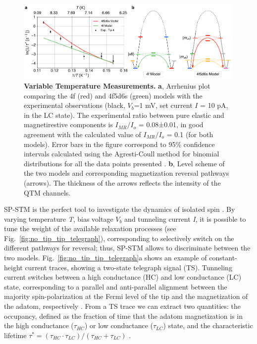 \documentclass[
reprint,amsmath,amssymb,aps]{revtex4-2}
\begin{document}
\begin{figure}[t!]
\includegraphics[width=0.99\textwidth]{Fig3_new.pdf}
\caption{\textbf{Variable Temperature Measurements.} \textbf{a}, Arrhenius plot comparing the 4f (red) and 4f5d6s (green) models with the experimental observations (black, $V_b$=1 mV, set current $I$ = 10 pA, in the LC state). The experimental ratio between pure elastic and magnetirestive components is $I_{MR}/I_{o}$ = 0.08±0.01, in good agreement with the calculated  value of $I_{MR}/I_{o}$ = 0.1 (for both models). Error bars in the figure correspond to 95$\%$ confidence intervals calculated using the Agresti-Coull method for binomial distributions for all the data points presented \citep{agresti1998}. \textbf{b}, Level scheme of the two models and corresponding magnetization reversal pathways (arrows). The thickness of the arrows reflects the intensity of the QTM channels.
\label{fig:temp} }
\end{figure}

SP-STM is the perfect tool to investigate the dynamics of isolated spin \cite{wiesendanger_ObservationVacuumTunneling_1990,Khajetoorians2013,paul_ControlMillisecondSpin_2017,Natterer2017,Natterer2018}. By varying temperature \textit{T}, bias voltage $V_b$ and tunneling current \textit{I}, it is possible to tune the weight of the available relaxation processes (see Fig.~\ref{fig:no_tip_tip_telegraph}), corresponding to selectively switch on the different pathways for reversal; thus, SP-STM allows to discriminate between the two models. 
Fig.~\ref{fig:no_tip_tip_telegraph}a shows an example of constant-height current traces, showing a two-state
telegraph signal (TS). Tunneling current switches between a high conductance (HC) and low conductance (LC) state, corresponding to a parallel and anti-parallel alignment between the majority spin-polarization at the Fermi level of the tip and the magnetization of the adatom, respectively \cite{delgado2010,paul_ControlMillisecondSpin_2017}. From a TS trace we can extract two quantities: the occupancy, defined as the fraction of time that the adatom magnetization is in the high conductance ($\tau_{HC}$) or low conductance ($\tau_{LC}$) state, and the characteristic lifetime $\tau ^*=(\tau_{HC}  \cdot \tau_{LC})/( \tau_{HC} + \tau_{LC})$ \cite{Khajetoorians2013}. 
\end{document}
